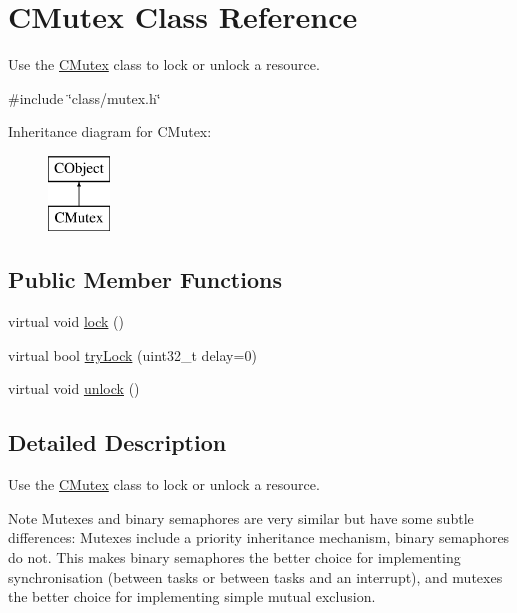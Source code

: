 \hypertarget{class_c_mutex}{\section{C\-Mutex Class Reference}
\label{class_c_mutex}
}


Use the \hyperlink{class_c_mutex}{C\-Mutex} class to lock or unlock a resource.  




{\ttfamily \#include \char`\"{}class/mutex.\-h\char`\"{}}

Inheritance diagram for C\-Mutex\-:\begin{figure}[H]
\begin{center}
\leavevmode
\includegraphics[height=2.000000cm]{d3/d0d/class_c_mutex}
\end{center}
\end{figure}
\subsection*{Public Member Functions}
\begin{DoxyCompactItemize}
\item 
virtual void \hyperlink{class_c_mutex_a820d77775dfd7d5dddfdac6bbf89b67a}{lock} ()
\item 
virtual bool \hyperlink{class_c_mutex_adb89cb4258a492458db9fb614c1681a9}{try\-Lock} (uint32\-\_\-t delay=0)
\item 
virtual void \hyperlink{class_c_mutex_aee0e6661ae4b790104a9a4205910d53d}{unlock} ()
\end{DoxyCompactItemize}


\subsection{Detailed Description}
Use the \hyperlink{class_c_mutex}{C\-Mutex} class to lock or unlock a resource. 

\begin{DoxyNote}{Note}
Mutexes and binary semaphores are very similar but have some subtle differences\-: Mutexes include a priority inheritance mechanism, binary semaphores do not. This makes binary semaphores the better choice for implementing synchronisation (between tasks or between tasks and an interrupt), and mutexes the better choice for implementing simple mutual exclusion. 
\end{DoxyNote}


